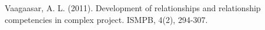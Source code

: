     Vaagaasar, A. L. (2011). Development of relationships and relationship competencies in complex project. ISMPB, 4(2), 294-307.






